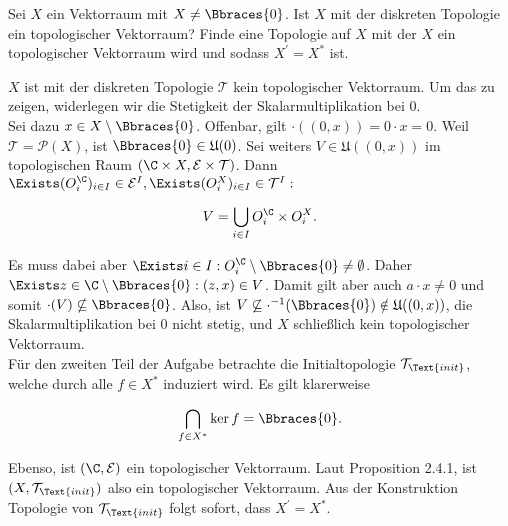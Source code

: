\begin{exercise}

Sei $X$ ein Vektorraum mit $X \neq \Bbraces{0}$.
Ist $X$ mit der diskreten Topologie ein topologischer Vektorraum?
Finde eine Topologie auf $X$ mit der $X$ ein topologischer Vektorraum wird und sodass $X^\prime = X^\ast$ ist.

\end{exercise}

\begin{solution}

$X$ ist mit der diskreten Topologie $\mathcal{T}$ kein topologischer Vektorraum.
Um das zu zeigen, widerlegen wir die Stetigkeit der Skalarmultiplikation bei $0$. \\

Sei dazu $x \in X \setminus \Bbraces{0}$.
Offenbar, gilt $\cdot((0, x)) = 0 \cdot x = 0$.
Weil $\mathcal{T} = \mathcal{P}(X)$, ist $\Bbraces{0} \in \mathfrak{U}(0)$.
Sei weiters $V \in \mathfrak{U}((0, x))$ im topologischen Raum $(\C \times X, \mathcal{E} \times \mathcal{T})$.
Dann $\Exists (O_i^\C)_{i \in I} \in \mathcal{E}^I, \Exists (O_i^X)_{i \in I} \in \mathcal{T}^I:$

\begin{align*}
  V = \bigcup_{i \in I} O_i^\C \times O_i^X.
\end{align*}

Es muss dabei aber $\Exists i \in I: O_i^\C \setminus \Bbraces{0} \neq \emptyset$.
Daher $\Exists z \in \C \setminus \Bbraces{0}: (z, x) \in V$.
Damit gilt aber auch $a \cdot x \neq 0$ und somit $\cdot(V) \nsubseteq \Bbraces{0}$.
Also, ist $V \not \subseteq \cdot^{-1}(\Bbraces{0}) \notin \mathfrak{U}((0, x))$, die Skalarmultiplikation bei $0$ nicht stetig, und $X$ schließlich kein topologischer Vektorraum. \\

Für den zweiten Teil der Aufgabe betrachte die Initialtopologie $\mathcal{T}_\Text{init}$, welche durch alle $f \in X^\ast$ induziert wird.
Es gilt klarerweise

\begin{align*}
  \bigcap_{f \in X^\ast} \ker f = \Bbraces{0}.
\end{align*}

Ebenso, ist $(\C, \mathcal{E})$ ein topologischer Vektorraum.
Laut Proposition 2.4.1, ist $(X, \mathcal{T}_\Text{init})$ also ein topologischer Vektorraum.
Aus der Konstruktion Topologie von $\mathcal{T}_\Text{init}$ folgt sofort, dass $X^\prime = X^\ast$.

\end{solution}

